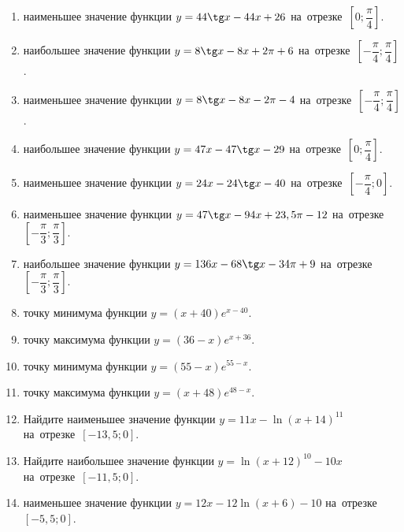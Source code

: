 \documentclass[a4paper,10pt]{article}
\begin{document}
\begin{enumerate}
\item {} наименьшее значение функции $y = 44\tg x-44x+26$ на~отрезке~$\left[0;\dfrac{\pi }{4}\right]$.

\item {} наибольшее значение функции $y=8\tg x-8x+2\pi +6$ на~отрезке~$\left[-\dfrac{\pi }{4};\dfrac{\pi }{4}\right]$.

\item {} наименьшее значение функции $y=8\tg x-8x-2\pi -4$ на~отрезке~$\left[-\dfrac{\pi }{4};\dfrac{\pi }{4}\right]$.

\item {} наибольшее значение функции $y = 47x-47\tg x -29$ на~отрезке~$\left[0;\dfrac{\pi }{4}\right]$.

\item {} наименьшее значение функции $y = 24x-24\tg x -40$ на~отрезке~$\left[-\dfrac{\pi }{4};0\right]$.

\item {} наименьшее значение функции $y = 47\tg x-94x+23,5 \pi -12$ на~отрезке~$\left[-\dfrac{\pi }{3};\dfrac{\pi }{3}\right]$.

\item {} наибольшее значение функции $y = 136x-68\tg x-34\pi +9$ на~отрезке~$\left[-\dfrac{\pi }{3};\dfrac{\pi }{3}\right]$.

\item {} точку минимума функции $y = \left(x+40\right)e^{x-40}$.

\item {} точку максимума функции $y = \left(36-x\right)e^{x+36}$.

\item {} точку минимума функции $y = \left(55-x\right)e^{55-x}$.

\item {} точку максимума функции $y = \left(x+48\right)e^{48-x}$.

\item Найдите наименьшее значение функции $y = 11x-\ln \left(x+14\right)^{11}$ на~отрезке~$\left[-13,5;0\right]$.

\item Найдите наибольшее значение функции $y = \ln \left(x+12\right)^{10}-10x$ на~отрезке~$\left[-11,5;0\right]$.

\item {} наименьшее значение функции $y = 12x-12\ln \left(x+6\right) -10$ на~отрезке~$\left[-5,5;0\right]$.


\end{enumerate}
\end{document}
